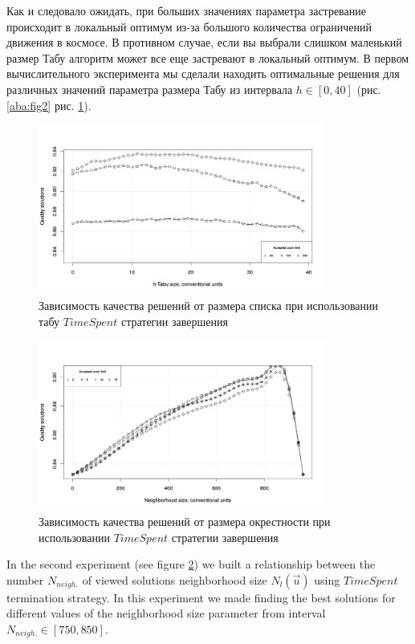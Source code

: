 \documentclass[]{TAACpaper}
\begin{document}
Как и следовало ожидать, при больших значениях параметра застревание происходит в локальный оптимум из-за большого количества ограничений движения в космосе. В противном случае, если вы выбрали слишком маленький размер Табу алгоритм может все еще застревают в локальный оптимум. В первом вычислительного эксперимента мы сделали находить оптимальные решения для различных значений параметра размера Табу из интервала $h \in [0, 40]$ (рис. \ref{aba:fig2} рис. \ref{aba:fig3}).
\begin{figure}[h]
	\hfil\includegraphics[height=2.2in]{images/tabuSize_time}\hfil
	\caption
	{
	Зависимость качества решений от размера списка при использовании табу $ TimeSpent $ стратегии завершения
	}
	\label{aba:fig3}
\end{figure}

\begin{figure}[h]
	\hfil\includegraphics[height=2.2in]{images/acceptedCountLimit}\hfil
	\caption
	{
	 Зависимость качества решений от размера окрестности при использовании $ TimeSpent $ стратегии завершения
	}
	\label{aba:fig4}
\end{figure}

In the second experiment (see figure \ref{aba:fig4}) we built a relationship between the number $N_{neigh.}$ of viewed solutions neighborhood size $N_l(\vec{u})$ using $TimeSpent$ termination strategy. In this experiment we made finding the best solutions for different values of the neighborhood size parameter from interval $N_{neigh.}\in[750, 850]$.
\end{document}
